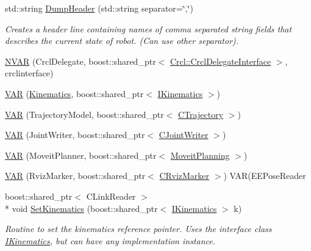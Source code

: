 \begin{DoxyCompactItemize}
std\-::string \hyperlink{structRCS_1_1CController_aaf2b0286ce10f78e5eee44e3613e588e}{Dump\-Header} (std\-::string separator=\char`\"{},\char`\"{})
\begin{DoxyCompactList}\small\item\em Creates a header line containing names of comma separated string fields that describes the current state of robot. (Can use other separator). \end{DoxyCompactList}\item 
\hyperlink{structRCS_1_1CController_a217e4bc45f9cc45a8b4e927e3e76d9c6}{N\-V\-A\-R} (Crcl\-Delegate, boost\-::shared\-\_\-ptr$<$ \hyperlink{classCrcl_1_1CrclDelegateInterface}{Crcl\-::\-Crcl\-Delegate\-Interface} $>$, crclinterface)
\item 
\hyperlink{structRCS_1_1CController_abb822466798247a45d3206ecae9c36fc}{V\-A\-R} (\hyperlink{SanityCheckTests_8cpp_ac2d60ae645ce73be6021c92b37789e7c}{Kinematics}, boost\-::shared\-\_\-ptr$<$ \hyperlink{classIKinematics}{I\-Kinematics} $>$)
\item 
\hyperlink{structRCS_1_1CController_a220e4784a98f240d3421ae67c79356d2}{V\-A\-R} (Trajectory\-Model, boost\-::shared\-\_\-ptr$<$ \hyperlink{classCTrajectory}{C\-Trajectory} $>$)
\item 
\hyperlink{structRCS_1_1CController_abe34674042d0b1b983a3e4117310f66c}{V\-A\-R} (Joint\-Writer, boost\-::shared\-\_\-ptr$<$ \hyperlink{classCJointWriter}{C\-Joint\-Writer} $>$)
\item 
\hyperlink{structRCS_1_1CController_a4bada8d96b15d19a1b4255f00993a241}{V\-A\-R} (Moveit\-Planner, boost\-::shared\-\_\-ptr$<$ \hyperlink{classMoveitPlanning}{Moveit\-Planning} $>$)
\item 
\hyperlink{structRCS_1_1CController_ad7509a0e8611db8b727493428d1a2a87}{V\-A\-R} (Rviz\-Marker, boost\-::shared\-\_\-ptr$<$ \hyperlink{classCRvizMarker}{C\-Rviz\-Marker} $>$) V\-A\-R(E\-E\-Pose\-Reader
\item 
boost\-::shared\-\_\-ptr$<$ C\-Link\-Reader $>$\\*
 void \hyperlink{structRCS_1_1CController_a2cfc01ab9d46878d06051cf744390542}{Set\-Kinematics} (boost\-::shared\-\_\-ptr$<$ \hyperlink{classIKinematics}{I\-Kinematics} $>$ k)
\begin{DoxyCompactList}\small\item\em Routine to set the kinematics reference pointer. Uses the interface class \hyperlink{classIKinematics}{I\-Kinematics}, but can have any implementation instance. \end{DoxyCompactList}\item 

\end{DoxyCompactItemize}
